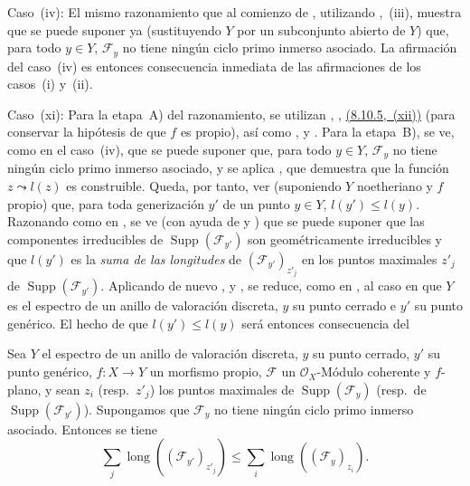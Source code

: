 \begin{env}[12.2.1.2]
\label{IV.12.2.1.2}
Caso~(iv): El mismo razonamiento que al comienzo de , utilizando ,~(iii), muestra que se puede suponer ya (sustituyendo $Y$ por un subconjunto abierto de $Y$) que, para todo $y\in Y$, $\mathcal F_y$ no tiene ningún ciclo primo inmerso asociado.
La afirmación del caso~(iv) es entonces consecuencia inmediata de las afirmaciones de los casos~(i) y~(ii).
\end{env}




\begin{env}[12.2.1.3]
\label{IV.12.2.1.3}

Caso~(xi): Para la etapa~A) del razonamiento, se utilizan , , {\hyperlink{ega4.c04.thm.8-10-5}{(8.10.5,~(xii))}} (para conservar la hipótesis de que $f$ es propio), así como ,  y .
Para la etapa~B), se ve, como en el caso~(iv), que se puede suponer que, para todo $y\in Y$, $\mathcal F_y$ no tiene ningún ciclo primo inmerso asociado, y se aplica , que demuestra que la función $z\leadsto l(z)$ es construible.
Queda, por tanto, ver (suponiendo $Y$ noetheriano y $f$ propio) que, para toda generización $y'$ de un punto $y\in Y$, $l(y')\leq l(y)$.
Razonando como en , se ve (con ayuda de  y ) que se puede suponer que las componentes irreducibles de $\operatorname{Supp}(\mathcal F_{y'})$ son geométricamente irreducibles y que $l(y')$ es la \emph{suma de las longitudes} de $(\mathcal F_{y'})_{z'_j}$ en los puntos maximales $z'_j$ de $\operatorname{Supp}(\mathcal F_{y'})$.
Aplicando de nuevo ,  y , se reduce, como en , al caso en que $Y$ es el espectro de un anillo de valoración discreta, $y$ su punto cerrado e $y'$ su punto genérico.
El hecho de que $l(y')\leq l(y)$ será entonces consecuencia del

\begin{lemma}[12.2.1.4]
\label{IV.12.2.1.4}
Sea $Y$ el espectro de un anillo de valoración discreta, $y$ su punto cerrado, $y'$ su punto genérico, $f:X\to Y$ un morfismo propio, $\mathcal F$ un $\mathcal O_X$-Módulo coherente y $f$-plano, y sean $z_i$ \textup{(resp.\ $z'_j$)} los puntos maximales de $\operatorname{Supp}(\mathcal F_y)$ \textup{(resp.\ de $\operatorname{Supp}(\mathcal F_{y'})$)}.
Supongamos que $\mathcal F_y$ no tiene ningún ciclo primo inmerso asociado.
Entonces se tiene
\[
  \sum_j\operatorname{long}((\mathcal F_{y'})_{z'_j})
  \leq\sum_i\operatorname{long}((\mathcal F_y)_{z_i}).
\]
\end{lemma}


\end{env}
